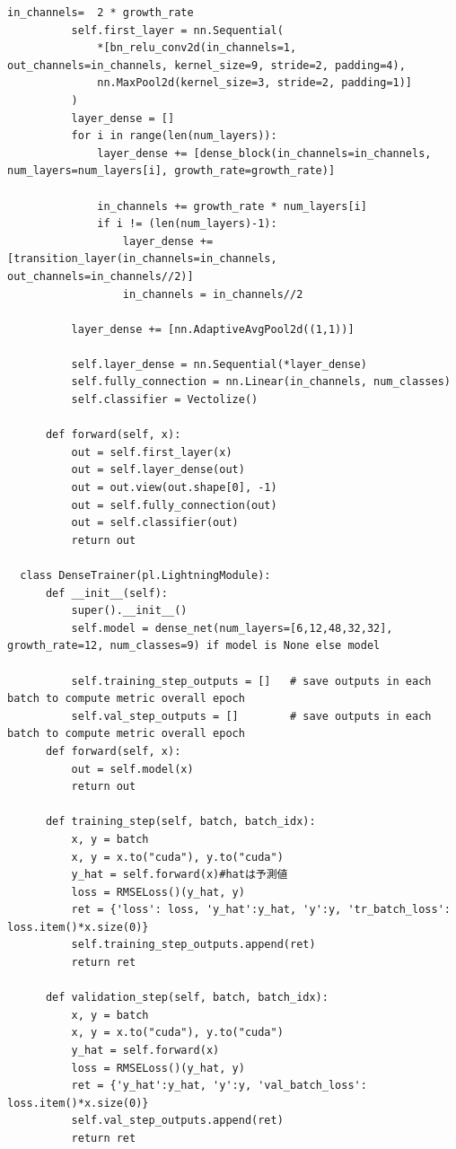 \documentclass[a4paper,11pt,dvipdfmx]{jreport}
\begin{document}
\begin{lstlisting}[caption=印象判定用NN{,} DenseNetに関するソースコード, label=source]
          in_channels=  2 * growth_rate
          self.first_layer = nn.Sequential(
              *[bn_relu_conv2d(in_channels=1, out_channels=in_channels, kernel_size=9, stride=2, padding=4),
              nn.MaxPool2d(kernel_size=3, stride=2, padding=1)]
          )
          layer_dense = []
          for i in range(len(num_layers)):
              layer_dense += [dense_block(in_channels=in_channels, num_layers=num_layers[i], growth_rate=growth_rate)]
  
              in_channels += growth_rate * num_layers[i]
              if i != (len(num_layers)-1):
                  layer_dense += [transition_layer(in_channels=in_channels, out_channels=in_channels//2)]
                  in_channels = in_channels//2
  
          layer_dense += [nn.AdaptiveAvgPool2d((1,1))]
  
          self.layer_dense = nn.Sequential(*layer_dense)
          self.fully_connection = nn.Linear(in_channels, num_classes)
          self.classifier = Vectolize()
  
      def forward(self, x):
          out = self.first_layer(x)
          out = self.layer_dense(out)
          out = out.view(out.shape[0], -1)
          out = self.fully_connection(out)
          out = self.classifier(out)
          return out
  
  class DenseTrainer(pl.LightningModule):
      def __init__(self):
          super().__init__()
          self.model = dense_net(num_layers=[6,12,48,32,32], growth_rate=12, num_classes=9) if model is None else model
  
          self.training_step_outputs = []   # save outputs in each batch to compute metric overall epoch
          self.val_step_outputs = []        # save outputs in each batch to compute metric overall epoch
      def forward(self, x):
          out = self.model(x)
          return out
  
      def training_step(self, batch, batch_idx):
          x, y = batch
          x, y = x.to("cuda"), y.to("cuda")
          y_hat = self.forward(x)#hatは予測値
          loss = RMSELoss()(y_hat, y)
          ret = {'loss': loss, 'y_hat':y_hat, 'y':y, 'tr_batch_loss': loss.item()*x.size(0)}
          self.training_step_outputs.append(ret)
          return ret
  
      def validation_step(self, batch, batch_idx):
          x, y = batch
          x, y = x.to("cuda"), y.to("cuda")
          y_hat = self.forward(x)
          loss = RMSELoss()(y_hat, y)
          ret = {'y_hat':y_hat, 'y':y, 'val_batch_loss': loss.item()*x.size(0)}
          self.val_step_outputs.append(ret)
          return ret
  

\end{lstlisting}
\end{document}
